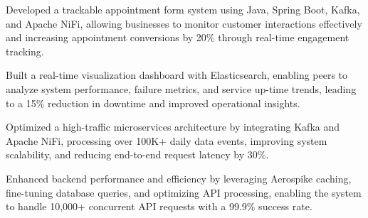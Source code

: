 \vspace{3pt}
\begin{tightemize}
    \item Developed a trackable appointment form system using Java, Spring Boot, Kafka, and Apache NiFi, allowing businesses to monitor customer interactions effectively and increasing appointment conversions by 20\% through real-time engagement tracking.
    \item Built a real-time visualization dashboard with Elasticsearch, enabling peers to analyze system performance, failure metrics, and service up-time trends, leading to a 15\% reduction in downtime and improved operational insights.
    \item Optimized a high-traffic microservices architecture by integrating Kafka and Apache NiFi, processing over 100K+ daily data events, improving system scalability, and reducing end-to-end request latency by 30\%.
    \item Enhanced backend performance and efficiency by leveraging Aerospike caching, fine-tuning database queries, and optimizing API processing, enabling the system to handle 10,000+ concurrent API requests with a 99.9\% success rate.
\end{tightemize}
